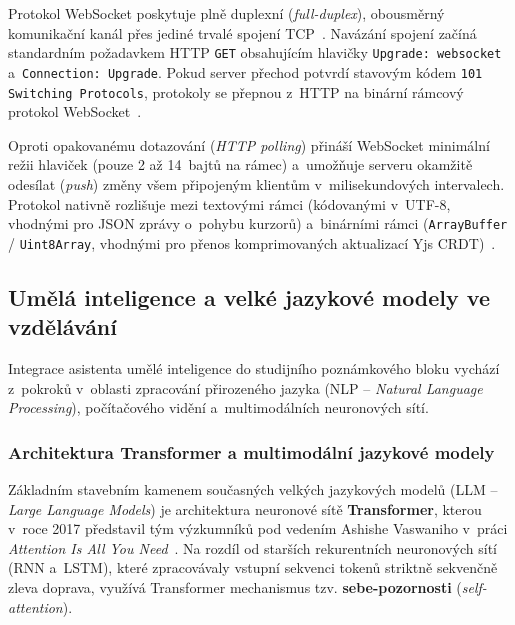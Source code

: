 \documentclass[12pt, a4paper, oneside]{article}
\begin{document}
Protokol WebSocket poskytuje plně duplexní (\textit{full-duplex}), obousměrný komunikační kanál přes jediné trvalé spojení TCP~\cite{rfc6455}. Navázání spojení začíná standardním požadavkem HTTP \texttt{GET} obsahujícím hlavičky \texttt{Upgrade: websocket} a~\texttt{Connection: Upgrade}. Pokud server přechod potvrdí stavovým kódem \texttt{101 Switching Protocols}, protokoly se přepnou z~HTTP na binární rámcový protokol WebSocket~\cite{rfc6455}.

Oproti opakovanému dotazování (\textit{HTTP polling}) přináší WebSocket minimální režii hlaviček (pouze 2 až 14~bajtů na rámec) a~umožňuje serveru okamžitě odesílat (\textit{push}) změny všem připojeným klientům v~milisekundových intervalech. Protokol nativně rozlišuje mezi textovými rámci (kódovanými v~UTF-8, vhodnými pro JSON zprávy o~pohybu kurzorů) a~binárními rámci (\texttt{ArrayBuffer} / \texttt{Uint8Array}, vhodnými pro přenos komprimovaných aktualizací Yjs CRDT)~\cite{rfc6455}.


\subsection{Umělá inteligence a velké jazykové modely ve vzdělávání}
\label{sec:teorie_ai}

Integrace asistenta umělé inteligence do studijního poznámkového bloku vychází z~pokroků v~oblasti zpracování přirozeného jazyka (NLP -- \textit{Natural Language Processing}), počítačového vidění a~multimodálních neuronových sítí.

\subsubsection{Architektura Transformer a multimodální jazykové modely}
\label{sec:teorie_llm}

Základním stavebním kamenem současných velkých jazykových modelů (LLM -- \textit{Large Language Models}) je architektura neuronové sítě \textbf{Transformer}, kterou v~roce 2017 představil tým výzkumníků pod vedením Ashishe Vaswaniho v~práci \textit{Attention Is All You Need}~\cite{vaswani2017attention}. Na rozdíl od starších rekurentních neuronových sítí (RNN a~LSTM), které zpracovávaly vstupní sekvenci tokenů striktně sekvenčně zleva doprava, využívá Transformer mechanismus tzv. \textbf{sebe-pozornosti} (\textit{self-attention}).
\end{document}
